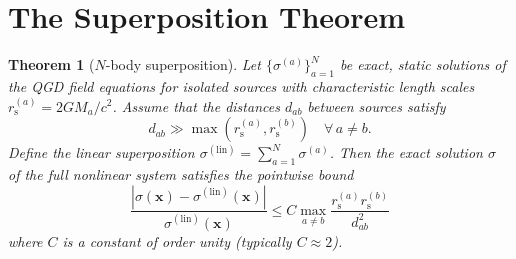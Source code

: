 \documentclass[11pt,a4paper]{article}
\theoremstyle{plain}
\newtheorem{theorem}{Theorem}[section]
\theoremstyle{definition}
\theoremstyle{remark}
\newcommand{\boldx}{\mathbf{x}}
\newcommand{\rs}[1]{r_{\mathrm{s}}^{(#1)}}
\begin{document}
\section{The Superposition Theorem}
\label{sec:superposition}

\begin{theorem}[$N$-body superposition]\label{thm:superposition}
  Let $\{\sigma^{(a)}\}_{a=1}^N$ be exact, static solutions of the QGD field equations for isolated sources with characteristic length scales $\rs{a} = 2GM_a/c^2$.  Assume that the distances $d_{ab}$ between sources satisfy
  \[
    d_{ab} \gg \max(\rs{a}, \rs{b}) \quad \forall\, a \neq b.
  \]
  Define the linear superposition $\sigma^{(\mathrm{lin})} = \sum_{a=1}^N \sigma^{(a)}$.  Then the exact solution $\sigma$ of the full nonlinear system satisfies the pointwise bound
  \begin{equation}
    \boxed{\frac{|\sigma(\boldx) - \sigma^{(\mathrm{lin})}(\boldx)|}{\sigma^{(\mathrm{lin})}(\boldx)} \leq C\max_{a\neq b}\frac{\rs{a}\rs{b}}{d_{ab}^2}}
  \end{equation}
  where $C$ is a constant of order unity (typically $C \approx 2$).
\end{theorem}
\end{document}
